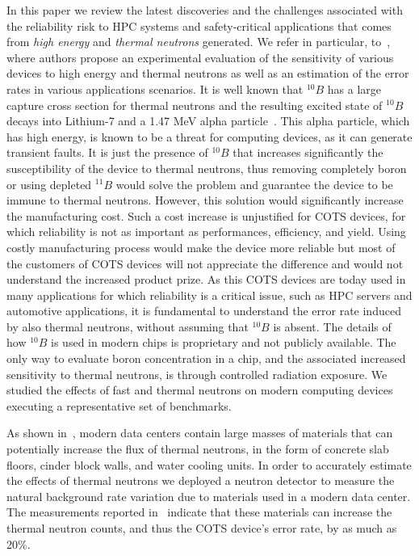 In this paper we review the latest discoveries and the challenges associated with the reliability risk to HPC systems and safety-critical applications that comes from \textit{high energy} and \textit{thermal neutrons} generated. We refer in particular, to~\cite{ETS, jsc2020}, where authors propose an experimental evaluation of the sensitivity of various devices to high energy and thermal neutrons as well as an estimation of the error rates in various applications scenarios.
It is well known that $^{10}B$ has a large capture cross section for thermal neutrons and the resulting excited state of $^{10}B$ decays into Lithium-7 and a 1.47 MeV alpha particle~\cite{ziegler2004ser, Baumann2005}. This alpha particle, which has high energy, is known to be a threat for computing devices, as it can generate transient faults. It is just the presence of $^{10}B$ that increases significantly the susceptibility of the device to thermal neutrons, thus removing completely boron or using depleted $^{11}B$ would solve the problem and guarantee the device to be immune to thermal neutrons. However, this solution would significantly increase the manufacturing cost. Such a cost increase is unjustified for COTS devices, for which reliability is not as important as performances, efficiency, and yield. Using costly manufacturing process would make the device more reliable but most of the customers of COTS devices will not appreciate the difference and would not understand the increased product prize. As this COTS devices are today used in many applications for which reliability is a critical issue, such as HPC servers and automotive applications, it is fundamental to understand the error rate induced by also thermal neutrons, without assuming that $^{10}B$ is absent. The details of how  $^{10}B$ is used in modern chips is proprietary and not publicly available. The only way to evaluate boron concentration in a chip, and the associated increased sensitivity to thermal neutrons, is through controlled radiation exposure. We studied the effects of fast and thermal neutrons on modern computing devices executing a representative set of benchmarks.

As shown in~\cite{JSC}, modern data centers contain large masses of materials that can potentially increase the flux of thermal neutrons, in the form of concrete slab floors, cinder block walls, and water cooling units. In order to accurately estimate the effects of thermal neutrons we deployed a neutron detector to measure the natural background rate variation due to materials used in a modern data center. The measurements reported in~\cite{jsc2020} indicate that these materials  can increase the thermal neutron counts, and thus the COTS device's error rate, by as much as 20\%. 


